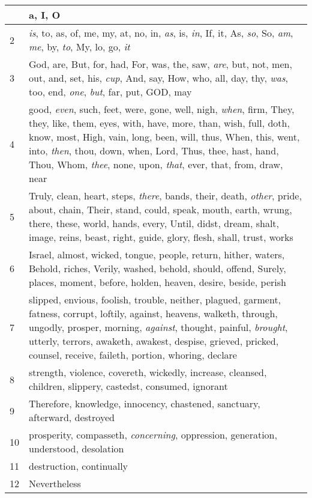 \begin{longtable}{l|p{3.75in}}
\hline \hline
\endlastfoot
1 & a, I, O \\ \hline
2 & \emph{is}, to, as, of, me, my, at, no, in, \emph{as}, is, \emph{in}, If, it, As, \emph{so}, So, \emph{am}, \emph{me}, by, \emph{to}, My, lo, go, \emph{it} \\ \hline
3 & God, are, But, for, had, For, was, the, saw, \emph{are}, but, not, men, out, and, set, his, \emph{cup}, And, say, How, who, all, day, thy, \emph{was}, too, end, \emph{one}, \emph{but}, far, put, GOD, may \\ \hline
4 & good, \emph{even}, such, feet, were, gone, well, nigh, \emph{when}, firm, They, they, like, them, eyes, with, have, more, than, wish, full, doth, know, most, High, vain, long, been, will, thus, When, this, went, into, \emph{then}, thou, down, when, Lord, Thus, thee, hast, hand, Thou, Whom, \emph{thee}, none, upon, \emph{that}, ever, that, from, draw, near \\ \hline
5 & Truly, clean, heart, steps, \emph{there}, bands, their, death, \emph{other}, pride, about, chain, Their, stand, could, speak, mouth, earth, wrung, there, these, world, hands, every, Until, didst, dream, shalt, image, reins, beast, right, guide, glory, flesh, shall, trust, works \\ \hline
6 & Israel, almost, wicked, tongue, people, return, hither, waters, Behold, riches, Verily, washed, behold, should, offend, Surely, places, moment, before, holden, heaven, desire, beside, perish \\ \hline
7 & slipped, envious, foolish, trouble, neither, plagued, garment, fatness, corrupt, loftily, against, heavens, walketh, through, ungodly, prosper, morning, \emph{against}, thought, painful, \emph{brought}, utterly, terrors, awaketh, awakest, despise, grieved, pricked, counsel, receive, faileth, portion, whoring, declare \\ \hline
8 & strength, violence, covereth, wickedly, increase, cleansed, children, slippery, castedst, consumed, ignorant \\ \hline
9 & Therefore, knowledge, innocency, chastened, sanctuary, afterward, destroyed \\ \hline
10 & prosperity, compasseth, \emph{concerning}, oppression, generation, understood, desolation \\ \hline
11 & destruction, continually \\ \hline
12 & Nevertheless \\ \hline
\end{longtable}






